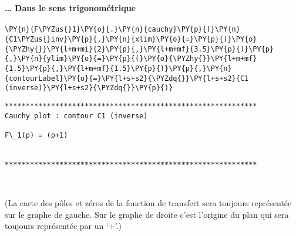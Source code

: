     \begin{center}
    \end{center}
    { \hspace*{\fill} \\}
    
    \hypertarget{dans-le-sens-trigonomuxe9trique}{%
\paragraph{\ldots{} Dans le sens
trigonométrique}\label{dans-le-sens-trigonomuxe9trique}}

    \begin{tcolorbox}[breakable, size=fbox, boxrule=1pt, pad at break*=1mm,colback=cellbackground, colframe=cellborder]
\begin{Verbatim}[commandchars=\\\{\}]
\PY{n}{F\PYZus{}1}\PY{o}{.}\PY{n}{cauchy}\PY{p}{(}\PY{n}{C1\PYZus{}inv}\PY{p}{,}\PY{n}{xlim}\PY{o}{=}\PY{p}{(}\PY{o}{\PYZhy{}}\PY{l+m+mi}{2}\PY{p}{,}\PY{l+m+mf}{3.5}\PY{p}{)}\PY{p}{,}\PY{n}{ylim}\PY{o}{=}\PY{p}{(}\PY{o}{\PYZhy{}}\PY{l+m+mf}{1.5}\PY{p}{,}\PY{l+m+mf}{1.5}\PY{p}{)}\PY{p}{,}\PY{n}{contourLabel}\PY{o}{=}\PY{l+s+s2}{\PYZdq{}}\PY{l+s+s2}{C1 (inverse)}\PY{l+s+s2}{\PYZdq{}}\PY{p}{)}
\end{Verbatim}
\end{tcolorbox}

    \begin{Verbatim}[commandchars=\\\{\}]
************************************************************
Cauchy plot : contour C1 (inverse)

F\_1(p) = (p+1)


************************************************************

    \end{Verbatim}

    \begin{center}
    \end{center}
    { \hspace*{\fill} \\}
    
    (La carte des pôles et zéros de la fonction de transfert sera toujours
représentée sur le graphe de gauche. Sur le graphe de droite c'est
l'origine du plan qui sera toujours représentée par un `+'.)

